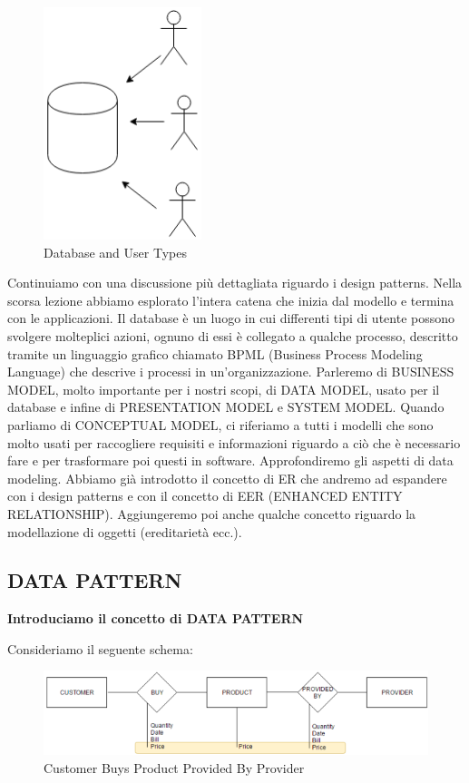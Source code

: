\begin{center}
\begin{figure}[H]
\centering
\includegraphics[scale=1]{figures/dbut.png}
\caption{Database and User Types}
\end{figure}
\end{center}

Continuiamo con una discussione più dettagliata riguardo i design patterns. Nella scorsa lezione abbiamo esplorato l’intera catena che inizia dal modello e termina con le applicazioni. Il database è un luogo in cui differenti tipi di utente possono svolgere molteplici azioni, ognuno di essi è collegato a qualche processo, descritto tramite un linguaggio grafico chiamato BPML (Business Process Modeling Language) che descrive i processi in un’organizzazione. 
Parleremo di BUSINESS MODEL, molto importante per i nostri scopi, di DATA MODEL, usato per il database e infine di PRESENTATION MODEL e SYSTEM MODEL. 
Quando parliamo di CONCEPTUAL MODEL, ci riferiamo a tutti i modelli che sono molto usati per raccogliere requisiti e informazioni riguardo a ciò che è necessario fare e per trasformare poi questi in software. Approfondiremo gli aspetti di data modeling. 
Abbiamo già introdotto il concetto di ER che andremo ad espandere con i design patterns e con il concetto di EER (ENHANCED ENTITY RELATIONSHIP). Aggiungeremo poi anche qualche concetto riguardo la modellazione di oggetti (ereditarietà ecc.). 

\subsection{DATA PATTERN}

\textbf{Introduciamo il concetto di DATA PATTERN}

Consideriamo il seguente schema:

\begin{center}
\begin{figure}[H]
\centering
\includegraphics[scale=1]{figures/cbuyp.png}
\caption{Customer Buys Product Provided By Provider}
\end{figure}
\end{center}

